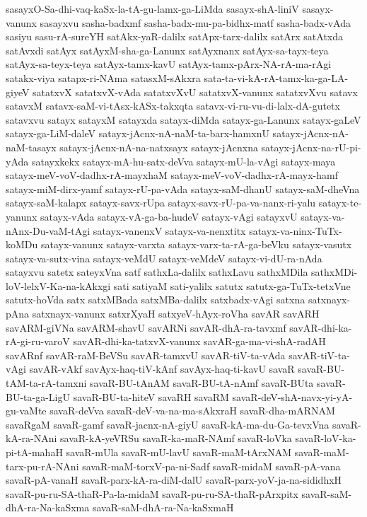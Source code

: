 {sasayxO-Sa-dhi-vaq-kaSx-la-tA-gu-lamx-ga-LiMda
sasayx-shA-liniV
sasayx-vanunx
sasayxvu
sasha-badxmf
sasha-badx-mu-pa-bidhx-matf
sasha-badx-vAda
sasiyu
sasu-rA-sureYH
satAkx-yaR-dalilx
satApx-tarx-dalilx
satArx
satAtxda
satAvxdi
satAyx
satAyxM-sha-ga-Lanunx
satAyxnanx
satAyx-sa-tayx-teya
satAyx-sa-teyx-teya
satAyx-tamx-kavU
satAyx-tamx-pArx-NA-rA-ma-rAgi
satakx-viya
satapx-ri-NAma
satasxM-sAkxra
sata-ta-vi-kA-rA-tamx-ka-ga-LA-giyeV
satatxvX
satatxvX-vAda
satatxvXvU
satatxvX-vanunx
satatxvXvu
satavx
satavxM
satavx-saM-vi-tAsx-kASx-takxqta
satavx-vi-ru-vu-di-lalx-dA-gutetx
satavxvu
satayx
satayxM
satayxda
satayx-diMda
satayx-ga-Lanunx
satayx-gaLeV
satayx-ga-LiM-daleV
satayx-jAcnx-nA-naM-ta-barx-hamxnU
satayx-jAcnx-nA-naM-tasayx
satayx-jAcnx-nA-na-natxsayx
satayx-jAcnxna
satayx-jAcnx-na-rU-pi-yAda
satayxkekx
satayx-mA-hu-satx-deVva
satayx-mU-la-vAgi
satayx-maya
satayx-meV-voV-dadhx-rA-mayxhaM
satayx-meV-voV-dadhx-rA-mayx-hamf
satayx-miM-dirx-yamf
satayx-rU-pa-vAda
satayx-saM-dhanU
satayx-saM-dheVna
satayx-saM-kalapx
satayx-savx-rUpa
satayx-savx-rU-pa-va-nanx-ri-yalu
satayx-te-yanunx
satayx-vAda
satayx-vA-ga-ba-hudeV
satayx-vAgi
satayxvU
satayx-va-nAnx-Du-vaM-tAgi
satayx-vanenxV
satayx-va-nenxtitx
satayx-va-ninx-TuTx-koMDu
satayx-vanunx
satayx-varxta
satayx-varx-ta-rA-ga-beVku
satayx-vasutx
satayx-va-sutx-vina
satayx-veMdU
satayx-veMdeV
satayx-vi-dU-ra-nAda
satayxvu
satetx
sateyxVna
satf
sathxLa-dalilx
sathxLavu
sathxMDila
sathxMDi-loV-lelxV-Ka-na-kAkxgi
sati
satiyaM
sati-yalilx
satutx
satutx-ga-TuTx-tetxVne
satutx-hoVda
satx
satxMBada
satxMBa-dalilx
satxbadx-vAgi
satxna
satxnayx-pAna
satxnayx-vanunx
satxrXyaH
satxyeV-hAyx-roVha
savAR
savARH
savARM-giVNa
savARM-shavU
savARNi
savAR-dhA-ra-tavxmf
savAR-dhi-ka-rA-gi-ru-varoV
savAR-dhi-ka-tatxvX-vanunx
savAR-ga-ma-vi-shA-radAH
savARnf
savAR-raM-BeVSu
savAR-tamxvU
savAR-tiV-ta-vAda
savAR-tiV-ta-vAgi
savAR-vAkf
savAyx-haq-tiV-kAnf
savAyx-haq-ti-kavU
savaR
savaR-BU-tAM-ta-rA-tamxni
savaR-BU-tAnAM
savaR-BU-tA-nAmf
savaR-BUta
savaR-BU-ta-ga-LigU
savaR-BU-ta-hiteV
savaRH
savaRM
savaR-deV-shA-navx-yi-yA-gu-vaMte
savaR-deVva
savaR-deV-va-na-ma-sAkxraH
savaR-dha-mARNAM
savaRgaM
savaR-gamf
savaR-jacnx-nA-giyU
savaR-kA-ma-du-Ga-tevxVna
savaR-kA-ra-NAni
savaR-kA-yeVRSu
savaR-ka-maR-NAmf
savaR-loVka
savaR-loV-ka-pi-tA-mahaH
savaR-mUla
savaR-mU-lavU
savaR-maM-tArxNAM
savaR-maM-tarx-pu-rA-NAni
savaR-maM-torxV-pa-ni-Sadf
savaR-midaM
savaR-pA-vana
savaR-pA-vanaH
savaR-parx-kA-ra-diM-dalU
savaR-parx-yoV-ja-na-sididhxH
savaR-pu-ru-SA-thaR-Pa-la-midaM
savaR-pu-ru-SA-thaR-pArxpitx
savaR-saM-dhA-ra-Na-kaSxma
savaR-saM-dhA-ra-Na-kaSxmaH
}
